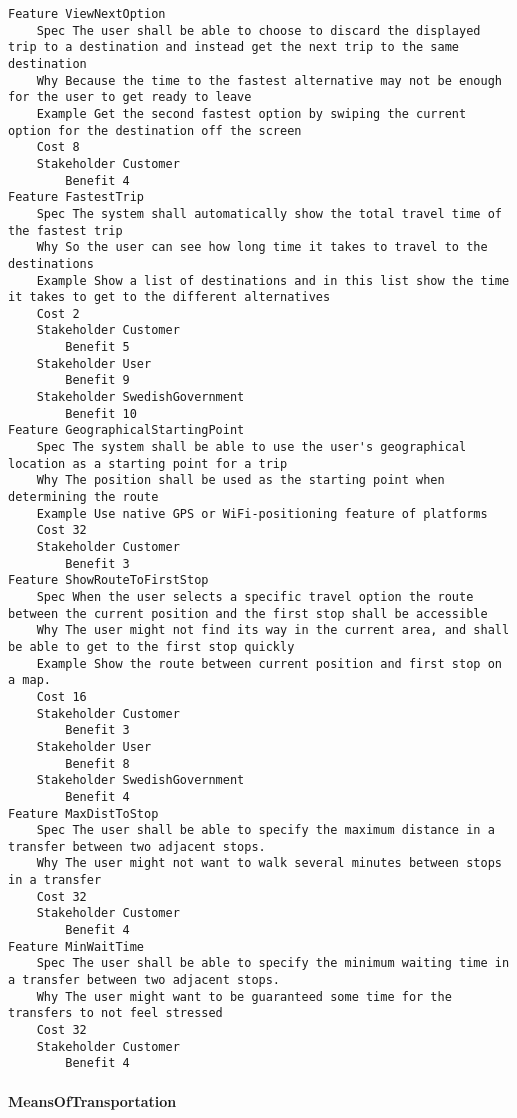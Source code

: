 \begin{lstlisting}
Feature ViewNextOption
	Spec The user shall be able to choose to discard the displayed trip to a destination and instead get the next trip to the same destination
	Why Because the time to the fastest alternative may not be enough for the user to get ready to leave
	Example Get the second fastest option by swiping the current option for the destination off the screen
	Cost 8
	Stakeholder Customer
		Benefit 4
Feature FastestTrip
	Spec The system shall automatically show the total travel time of the fastest trip
	Why So the user can see how long time it takes to travel to the destinations
	Example Show a list of destinations and in this list show the time it takes to get to the different alternatives
	Cost 2
	Stakeholder Customer
		Benefit 5
	Stakeholder User
		Benefit 9
	Stakeholder SwedishGovernment
		Benefit 10
Feature GeographicalStartingPoint
	Spec The system shall be able to use the user's geographical location as a starting point for a trip
	Why The position shall be used as the starting point when determining the route
	Example Use native GPS or WiFi-positioning feature of platforms
	Cost 32
	Stakeholder Customer
		Benefit 3
Feature ShowRouteToFirstStop
	Spec When the user selects a specific travel option the route between the current position and the first stop shall be accessible
	Why The user might not find its way in the current area, and shall be able to get to the first stop quickly
	Example Show the route between current position and first stop on a map.
	Cost 16
	Stakeholder Customer
		Benefit 3
	Stakeholder User
		Benefit 8
	Stakeholder SwedishGovernment
		Benefit 4
Feature MaxDistToStop
	Spec The user shall be able to specify the maximum distance in a transfer between two adjacent stops.
	Why The user might not want to walk several minutes between stops in a transfer
	Cost 32
	Stakeholder Customer
		Benefit 4
Feature MinWaitTime
	Spec The user shall be able to specify the minimum waiting time in a transfer between two adjacent stops.
	Why The user might want to be guaranteed some time for the transfers to not feel stressed
	Cost 32
	Stakeholder Customer
		Benefit 4

\end{lstlisting}
		
				
			 \paragraph{MeansOfTransportation}


